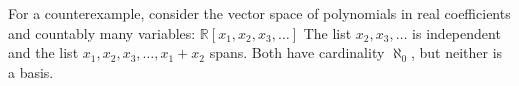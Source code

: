 \documentclass[11pt]{article}
\begin{document}
For a counterexample, consider the vector space of polynomials in real coefficients and countably many variables: $\mathbb{R}[x_{1}, x_{2}, x_{3}, \ldots]$ The list $x_{2}, x_{3}, \ldots$ is independent and the list $x_{1}, x_{2}, x_{3}, \ldots, x_{1} + x_{2}$ spans. Both have cardinality $\aleph_{0}$, but neither is a basis.

\end{document}
